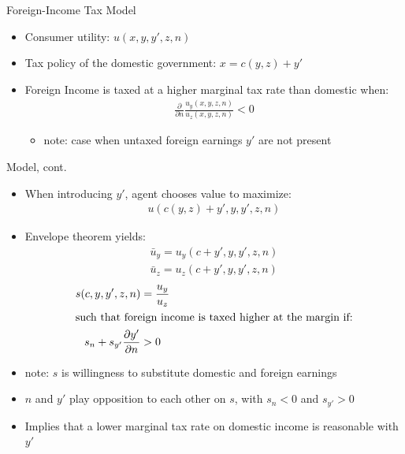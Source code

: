 \documentclass[aspectratio=169,professionalfonts]{beamer}
\begin{document}
\begin{frame}{Foreign-Income Tax Model}
  \begin{itemize}
    \item Consumer utility: $u(x, y, y', z, n)$
    \item Tax policy of the domestic government: $x = c(y, z) + y'$
    \item Foreign Income is taxed at a higher marginal tax rate than domestic when:
    \begin{gather*}
      \frac{\partial}{\partial n}\frac{u_y(x, y, z, n)}{u_z(x, y, z, n)} < 0
    \end{gather*}
    \begin{itemize}
      \item note: case when untaxed foreign earnings $y'$ are not present 
    \end{itemize}
  \end{itemize}
\end{frame}

\begin{frame}{Model, cont.}
  \begin{itemize}
    \item When introducing $y'$, agent chooses value to maximize:
    \begin{gather*}
      u(c(y, z) + y', y, y', z, n)
    \end{gather*}
    \item Envelope theorem yields:
    \begin{gather*}
      \bar{u}_y = u_y(c+y', y, y', z, n) \\
      \bar{u}_z = u_z(c + y', y, y', z, n)
    \end{gather*}
    \begin{gather*}
      s(c,y,y',z,n) = \frac{u_y}{u_z} \\ 
      \shortintertext{such that foreign income is taxed higher at the margin if:}
      s_n + s_{y'}\frac{\partial y'}{\partial n} > 0
    \end{gather*}
    \item note: $s$ is willingness to substitute domestic and foreign earnings
    \item $n$ and $y'$ play opposition to each other on $s$, with $s_n<0$ and $s_{y'}>0$
    \item Implies that a lower marginal tax rate on domestic income is reasonable with $y'$
  \end{itemize}
\end{frame}
\end{document}
